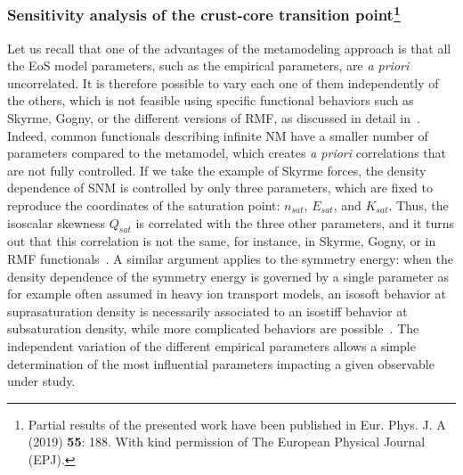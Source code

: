 \subsubsection{Sensitivity analysis of the crust-core transition
point\footnote{Partial results of the presented work have been published in 
Eur. Phys. J. A (2019) \textbf{55}: 188. With kind permission of The European
Physical Journal (EPJ).}}\label{subsubsec:sensana}

Let us recall that one of the advantages of the metamodeling approach is that 
all the EoS model parameters, such as the empirical parameters, 
are \textit{a priori} uncorrelated. 
It is therefore possible to vary each one of them independently of the others, 
which is not feasible using specific functional behaviors such as Skyrme, 
Gogny, or the different versions of RMF, as discussed in detail
in~\cite{Margueron2018a,Margueron2019}. 
Indeed, common functionals describing infinite NM have a smaller number of 
parameters compared to the metamodel, which creates \textit{a priori} 
correlations that are not fully controlled. If we take the example of Skyrme 
forces, the density dependence of SNM is controlled by only three parameters, 
which are fixed to reproduce the coordinates of the saturation point: 
$n_{sat}$, $E_{sat}$, and $K_{sat}$. Thus, the isoscalar skewness $Q_{sat}$ is 
correlated with the three other parameters, and it turns out that this 
correlation is not the same, for instance, in Skyrme, Gogny, or in RMF 
functionals~\cite{Margueron2019}. 
A similar argument applies to the symmetry energy: when the density dependence 
of the symmetry energy is governed by a single parameter as for example often 
assumed in heavy ion 
transport models, an isosoft behavior at suprasaturation density is necessarily 
associated to an isostiff behavior at subsaturation density, while more 
complicated behaviors are possible~\cite{Margueron2019}. The independent 
variation of the different empirical parameters allows a simple determination 
of the most influential parameters impacting a given observable under study. 

